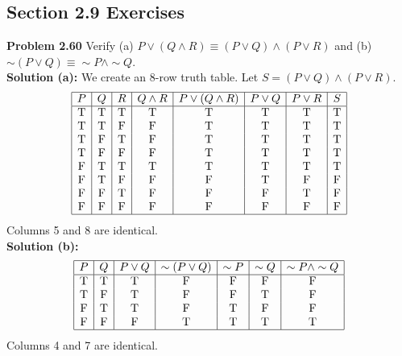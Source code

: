 \documentclass{article}
\begin{document}
\subsection*{Section 2.9 Exercises}

\textbf{Problem 2.60} Verify (a) $P \lor (Q \land R) \equiv (P \lor Q) \land (P \lor R)$ and (b) $\sim(P \lor Q) \equiv \sim P \land \sim Q$.
\\[0.5em]
\textbf{Solution (a):} We create an 8-row truth table. Let $S = (P \lor Q) \land (P \lor R)$.
\[
\begin{array}{|c|c|c|c|c|c|c|c|}
\hline
P & Q & R & Q \land R & P \lor (Q \land R) & P \lor Q & P \lor R & S \\
\hline
\text{T} & \text{T} & \text{T} & \text{T} & \text{T} & \text{T} & \text{T} & \text{T} \\
\text{T} & \text{T} & \text{F} & \text{F} & \text{T} & \text{T} & \text{T} & \text{T} \\
\text{T} & \text{F} & \text{T} & \text{F} & \text{T} & \text{T} & \text{T} & \text{T} \\
\text{T} & \text{F} & \text{F} & \text{F} & \text{T} & \text{T} & \text{T} & \text{T} \\
\text{F} & \text{T} & \text{T} & \text{T} & \text{T} & \text{T} & \text{T} & \text{T} \\
\text{F} & \text{T} & \text{F} & \text{F} & \text{F} & \text{T} & \text{F} & \text{F} \\
\text{F} & \text{F} & \text{T} & \text{F} & \text{F} & \text{F} & \text{T} & \text{F} \\
\text{F} & \text{F} & \text{F} & \text{F} & \text{F} & \text{F} & \text{F} & \text{F} \\
\hline
\end{array}
\]
Columns 5 and 8 are identical.
\\
\textbf{Solution (b):}
\[
\begin{array}{|c|c|c|c|c|c|c|}
\hline
P & Q & P \lor Q & \sim(P \lor Q) & \sim P & \sim Q & \sim P \land \sim Q \\
\hline
\text{T} & \text{T} & \text{T} & \text{F} & \text{F} & \text{F} & \text{F} \\
\text{T} & \text{F} & \text{T} & \text{F} & \text{F} & \text{T} & \text{F} \\
\text{F} & \text{T} & \text{T} & \text{F} & \text{T} & \text{F} & \text{F} \\
\text{F} & \text{F} & \text{F} & \text{T} & \text{T} & \text{T} & \text{T} \\
\hline
\end{array}
\]
Columns 4 and 7 are identical.
\end{document}
